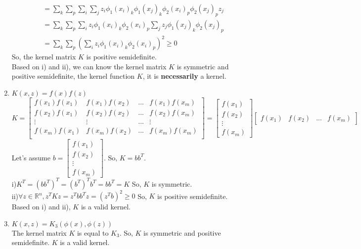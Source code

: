 \begin{answer}
\begin{enumerate}
\begin{align*}
    &=\sum\limits_k\sum\limits_p \sum\limits_i \sum\limits_j z_i\phi_1(x_i)_k \phi_1(x_j)_k \phi_2(x_i)_p \phi_2(x_j)_p z_j\\
    &=\sum\limits_k\sum\limits_p \sum\limits_i z_i \phi_1(x_i)_k \phi_2(x_i)_p \sum\limits_j z_j \phi_1(x_j)_k \phi_2(x_j)_p\\
    &=\sum\limits_k\sum\limits_p (\sum\limits_i z_i \phi_1(x_i)_k \phi_2(x_i)_p)^2 \geq 0
\end{align*}    
So, the kernel matrix $K$ is positive semidefinite.\\
Based on i) and ii), we can know the kernel matrix $K$ is symmetric and positive semidefinite, the kernel function $K$, it is \textbf{necessarily} a kernel.
\item $K(x,z) = f(x)f(z)$\\
$K=\begin{bmatrix}f(x_1)f(x_1) & f(x_1)f(x_2) & ... & f(x_1)f(x_m)\\f(x_2)f(x_1) & f(x_2)f(x_2) & ... & f(x_2)f(x_m)\\ \vdots & \vdots & ... & \vdots\\f(x_m)f(x_1) & f(x_m)f(x_2) & ... & f(x_m)f(x_m)\\
\end{bmatrix} = \begin{bmatrix}f(x_1) \\ f(x_2)\\ \vdots \\ f(x_m)\end{bmatrix}\begin{bmatrix}f(x_1) & f(x_2) & ... & f(x_m)\end{bmatrix}$\\
Let's assume $b = \begin{bmatrix}f(x_1) \\ f(x_2)\\ \vdots \\ f(x_m)\end{bmatrix}$. So, $K = b b^T$.\\
i)$K^T = (b b^T)^T = (b^T)^T b^T = b b^T = K$ So, $K$ is symmetric.\\
ii)$\forall z \in \mathbb{R}^n, z^T K z = z^T b b^T z = (z^T b)^2 \geq 0$ So, $K$ is positive semidefinite.\\
Based on i) and ii), $K$ is a valid kernel.
\item $K(x,z) = K_3(\phi(x),\phi(z))$\\
The kernel matrix $K$ is equal to $K_3$. So, $K$ is symmetric and positive semidefinite. $K$ is a valid kernel.

\end{enumerate}
\end{answer}
